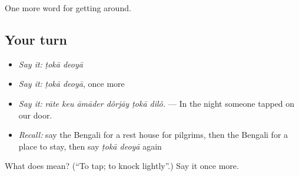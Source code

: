 \begin{grammarlens}[title={What you've built}]
One more word for getting around.
\end{grammarlens}

\subsection*{Your turn}
\begin{itemize}
\raggedright
  \item \emph{Say it:} \emph{ṭokā deoyā}
  \item \emph{Say it:} \emph{ṭokā deoyā}, once more
  \item \emph{Say it:} \emph{rāte keu āmāder dôrjāy ṭokā dilô.} — In the night someone tapped on our door.
  \item \emph{Recall:} say the Bengali for a rest house for pilgrims, then the Bengali for a place to stay, then say \emph{ṭokā deoyā} again
\end{itemize}

\begin{tcolorbox}[breakable,colback=teal!4,colframe=teal!35!black,title={Before you move on}]
What does   mean? (\textquotedblleft{}To tap; to knock lightly\textquotedblright{}.) Say it once more.
\end{tcolorbox}
